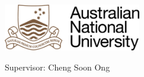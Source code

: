 
\begin{titlepage}

\begin{addmargin}[-1cm]{-3cm}
\begin{center}
\large

\hfill
\vfill

\begingroup
\color{Maroon} \\ \bigskip %
\endgroup


\vfill

\includegraphics[width=6cm]{Figures/ANU_Logo} \\ \bigskip %

\bigskip \bigskip %
Supervisor: Cheng Soon Ong\\
\myDegree \\
\myDepartment \\
\myUni \\ 
\bigskip \bigskip

\myTime  %

\vfill

\end{center}
\end{addmargin}

\end{titlepage}